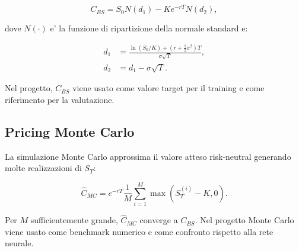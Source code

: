 \begin{equation}
    C_{BS} = S_0 N(d_1) - K e^{-rT} N(d_2),
\end{equation}

dove $N(\cdot)$ e' la funzione di ripartizione della normale standard e:

\begin{align}
    d_1 &= \frac{\ln(S_0/K) + \left(r + \frac{1}{2}\sigma^2\right)T}{\sigma\sqrt{T}}, \\
    d_2 &= d_1 - \sigma\sqrt{T}.
\end{align}

Nel progetto, $C_{BS}$ viene usato come valore target per il training e come riferimento per la valutazione.

\subsection{Pricing Monte Carlo}

La simulazione Monte Carlo approssima il valore atteso risk-neutral generando molte realizzazioni di $S_T$:

\begin{equation}
    \hat{C}_{MC} =
    e^{-rT}
    \frac{1}{M}
    \sum_{i=1}^{M}
    \max(S_T^{(i)} - K, 0).
\end{equation}

Per $M$ sufficientemente grande, $\hat{C}_{MC}$ converge a $C_{BS}$.
Nel progetto Monte Carlo viene usato come benchmark numerico e come confronto rispetto alla rete neurale.
